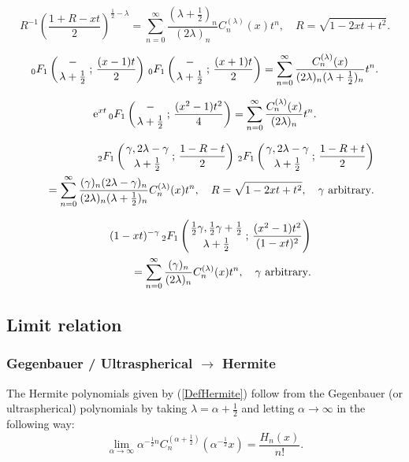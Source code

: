 \documentclass[envcountchap,graybox]{svmono}
\newcounter{rom}
\newcommand{\hyp}[5]{\mbox{}_{#1}{F}_{#2}
\left(\genfrac{}{}{0pt}{}{#3}{#4}\,;\,#5\right)}
\newcommand{\e}{\textrm{e}}
\newcommand{\hyp}[5]{\,\mbox{}_{#1}F_{#2}\!\left(
  \genfrac{}{}{0pt}{}{#3}{#4};#5\right)}
\begin{document}
\begin{equation}
\label{GenGegenbauer2}
R^{-1}\left(\frac{1+R-xt}{2}\right)^{\frac{1}{2}-\lambda}=\sum_{n=0}^{\infty}
\frac{(\lambda+\frac{1}{2})_n}{(2\lambda)_n}C_n^{(\lambda)}(x)t^n,
\quad R=\sqrt{1-2xt+t^2}.
\end{equation}

\begin{equation}
\label{GenGegenbauer3}
\hyp{0}{1}{-}{\lambda+\frac{1}{2}}{\frac{(x-1)t}{2}}\,
\hyp{0}{1}{-}{\lambda+\frac{1}{2}}{\frac{(x+1)t}{2}}
=\sum_{n=0}^{\infty}\frac{C_n^{(\lambda)}(x)}
{(2\lambda)_n(\lambda+\frac{1}{2})_n}t^n.
\end{equation}

\begin{equation}
\label{GenGegenbauer4}
\e^{xt}\,\hyp{0}{1}{-}{\lambda+\frac{1}{2}}{\frac{(x^2-1)t^2}{4}}=
\sum_{n=0}^{\infty}\frac{C_n^{(\lambda)}(x)}{(2\lambda)_n}t^n.
\end{equation}

\begin{eqnarray}
\label{GenGegenbauer5}
& &\hyp{2}{1}{\gamma,2\lambda-\gamma}{\lambda+\frac{1}{2}}{\frac{1-R-t}{2}}\,
\hyp{2}{1}{\gamma,2\lambda-\gamma}{\lambda+\frac{1}{2}}{\frac{1-R+t}{2}}\nonumber\\
& &{}=\sum_{n=0}^{\infty}\frac{(\gamma)_n(2\lambda-\gamma)_n}
{(2\lambda)_n(\lambda+\frac{1}{2})_n}C_n^{(\lambda)}(x)t^n,
\quad R=\sqrt{1-2xt+t^2},\quad\textrm{$\gamma$ arbitrary}.
\end{eqnarray}

\begin{eqnarray}
\label{GenGegenbauer6}
& &(1-xt)^{-\gamma}\,\hyp{2}{1}{\frac{1}{2}\gamma,\frac{1}{2}\gamma+\frac{1}{2}}
{\lambda+\frac{1}{2}}{\frac{(x^2-1)t^2}{(1-xt)^2}}\nonumber\\
& &{}=\sum_{n=0}^{\infty}\frac{(\gamma)_n}{(2\lambda)_n}C_n^{(\lambda)}(x)t^n,
\quad\textrm{$\gamma$ arbitrary}.
\end{eqnarray}

\subsection*{Limit relation}

\subsubsection*{Gegenbauer / Ultraspherical $\rightarrow$ Hermite}
The Hermite polynomials given by (\ref{DefHermite}) follow from the Gegenbauer (or
ultraspherical) polynomials by taking $\lambda=\alpha+\frac{1}{2}$ and letting
$\alpha\rightarrow\infty$ in the following way:
\begin{equation}
\lim_{\alpha\rightarrow\infty}
\alpha^{-\frac{1}{2}n}C_n^{(\alpha+\frac{1}{2})}(\alpha^{-\frac{1}{2}}x)=\frac{H_n(x)}{n!}.
\end{equation}
\end{document}
